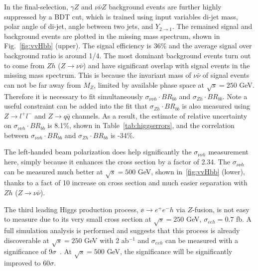 In the final-selection, $\gamma Z$ and $\nu\bar{\nu}Z$ background 
events are further highly suppressed by a BDT cut, which is trained 
using input variables di-jet mass, polar angle of di-jet, angle between
two jets, and $Y_{2\to1}$. The remained signal and background events
are plotted in the missing mass spectrum, shown in Fig.~\ref{fig:vvHbb} (upper).
The signal efficiency is 36\% and the average signal over background ratio is around 1/4.
The most dominant background events turn out to come from $Zh$ ($Z\to\nu\bar{\nu}$) and 
have significant overlap with signal events in the missing mass spectrum.
This is because the invariant mass of $\nu\bar{\nu}$ of signal events
can not be far away from $M_Z$, limited by available phase space at $\sqrt{s}=250$ GeV.
Therefore it is necessary to fit simultaneously $\sigma_{\nu\nu h}\cdot BR_{bb}$
and $\sigma_{Zh}\cdot BR_{bb}$. Note a useful constraint can be added into the fit
that $\sigma_{Zh}\cdot BR_{bb}$ is also measured 
using $Z\to l^+l^-$ and $Z\to q\bar{q}$ channels. 
As a result, the estimate of relative uncertainty on $\sigma_{\nu\nu h}\cdot BR_{bb}$
is 8.1\%, shown in Table~\ref{tab:higgserrors}, 
and the correlation between $\sigma_{\nu\nu h}\cdot BR_{bb}$ and
$\sigma_{Zh}\cdot BR_{bb}$ is -34\%.

The left-handed beam polarization does help significantly the $\sigma_{\nu\nu h}$
measurement here, simply because it enhances the cross section by a factor of 2.34.
The $\sigma_{\nu\nu h}$ can be measured much better at $\sqrt{s}=500$ GeV, 
shown in~\ref{fig:vvHbb} (lower), thanks
to a fact of 10 increase on cross section and much easier separation with $Zh$ ($Z\to\nu\bar{\nu}$).

The third leading Higgs production process, $\ee\to e^+e^- h$ via $Z$-fusion, is not easy to measure
due to its very small cross section at $\sqrt{s}=250$ GeV, $\sigma_{eeh}=0.7$ fb. 
A full simulation analysis is performed and 
suggests that this process is already discoverable at $\sqrt{s}=250$ GeV with 2 ab$^{-1}$ and
$\sigma_{eeh}$ can be measured with a significance of 9$\sigma$~\cite{Ogawa:2018}. 
At $\sqrt{s}=500$ GeV, the significance will be significantly improved to 60$\sigma$.

